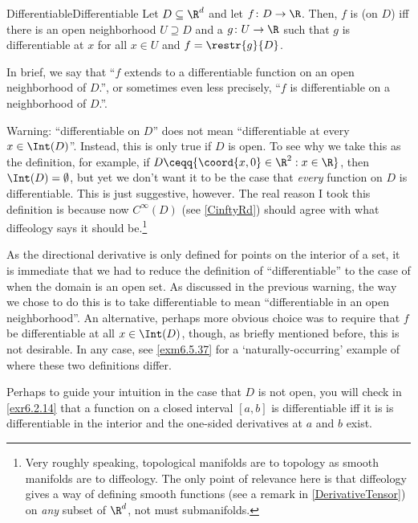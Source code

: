\begin{dfn}{Differentiable}{Differentiable}
Let $D\subseteq \R ^d$ and let $f\colon D\rightarrow \R$.  Then, $f$ is  (on $D$) iff there is an open neighborhood $U\supseteq D$ and a $g\colon U\rightarrow \R$ such that $g$ is differentiable at $x$ for all $x\in U$ and $f=\restr{g}{D}$.
\begin{rmk}
In brief, we say that ``$f$ extends to a differentiable function on an open neighborhood of $D$.'', or sometimes even less precisely, ``$f$ is differentiable on a neighborhood of $D$.''.
\end{rmk}
\begin{wrn}
Warning:  ``differentiable on $D$'' does not mean ``differentiable at every $x\in \Int (D)$''.  Instead, this is only true if $D$ is open.  To see why we take this as the definition, for example, if $D\ceqq \{ \coord{x,0}\in \R ^2:x\in \R\}$, then $\Int (D)=\emptyset$, but yet we don't want it to be the case that \emph{every} function on $D$ is differentiable.  This is just suggestive, however.  The real reason I took this definition is because now $C^{\infty}(D)$ (see \cref{CinftyRd}) should agree with what diffeology says it should be.\footnote{Very roughly speaking, topological manifolds are to topology as smooth manifolds are to diffeology.  The only point of relevance here is that diffeology gives a way of defining smooth functions (see a remark in \cref{DerivativeTensor}) on \emph{any} subset of $\R ^d$, not must submanifolds.}
\end{wrn}
\begin{rmk}
As the directional derivative is only defined for points on the interior of a set, it is immediate that we had to reduce the definition of ``differentiable'' to the case of when the domain is an open set.  As discussed in the previous warning, the way we chose to do this is to take differentiable to mean ``differentiable in an open neighborhood''.  An alternative, perhaps more obvious choice was to require that $f$ be differentiable at all $x\in \Int (D)$, though, as briefly mentioned before, this is not desirable.  In any case, see \cref{exm6.5.37} for a `naturally-occurring' example of where these two definitions differ.
\end{rmk}
\begin{rmk}
Perhaps to guide your intuition in the case that $D$ is not open, you will check in \cref{exr6.2.14} that a function on a closed interval $[a,b]$ is differentiable iff it is is differentiable in the interior and the one-sided derivatives at $a$ and $b$ exist.
\end{rmk}
\end{dfn}
